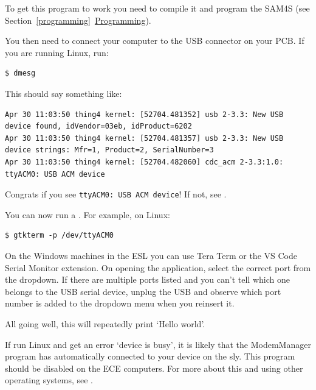 \inputminted{C}{../../src/test-apps/usb_serial_test1/usb_serial_test1.c}

To get this program to work you need to compile it and program the SAM4S (see
Section~\ref{programming}~\protect\hyperref[programming]{Programming}).

You then need to connect your computer to the USB connector on your PCB.
If you are running Linux, run:
%
\begin{verbatim}
$ dmesg
\end{verbatim}

This should say something like:
%
\begin{verbatim}
Apr 30 11:03:50 thing4 kernel: [52704.481352] usb 2-3.3: New USB device found, idVendor=03eb, idProduct=6202
Apr 30 11:03:50 thing4 kernel: [52704.481357] usb 2-3.3: New USB device strings: Mfr=1, Product=2, SerialNumber=3
Apr 30 11:03:50 thing4 kernel: [52704.482060] cdc_acm 2-3.3:1.0: ttyACM0: USB ACM device
\end{verbatim}

Congrats if you see \texttt{ttyACM0:\ USB\ ACM\ device}!  If not, see
.

You can now run a . For example, on Linux:
%
\begin{verbatim}
$ gtkterm -p /dev/ttyACM0
\end{verbatim}

On the Windows machines in the ESL you can use Tera Term or the VS Code Serial
Monitor extension. On opening the application, select the correct 
port from the  dropdown. If there are multiple  ports
listed and you can't tell which one belongs to the USB serial device, unplug the
USB and observe which  port number is added to the dropdown menu when
you reinsert it.

All going well, this will repeatedly print `Hello world'.

If run Linux and get an error `device is busy', it is likely that the
ModemManager program has automatically connected to your device on the
sly. This program should be disabled on the ECE computers. For more
about this and using other operating systems, see .


